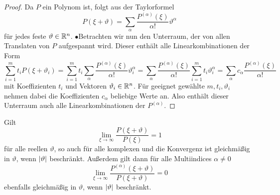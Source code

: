 \begin{proof}
\relax[$\supseteq$] Da $P$ ein Polynom ist, folgt aus der Taylorformel
\begin{equation}
P(\xi+\vartheta)=\sum_\alpha \dfrac{P^{(\alpha)}(\xi)}{\alpha!}\vartheta^{\alpha}
\end{equation}
für jedes feste $\vartheta\in\mathbb R^n$. $\bullet$\qquad [$\subseteq$] Betrachten wir nun den Unterraum, der von allen Translaten von $P$ aufgespannt wird. Dieser enthält alle Linearkombinationen der Form
\begin{equation}
\sum_{i=1}^m t_i P(\xi+\vartheta_i)=\sum_{i=1}^mt_i\sum_\alpha \dfrac{P^{(\alpha)}(\xi)}{\alpha!}\vartheta_i^\alpha =\sum_\alpha \dfrac{P^{(\alpha)}(\xi)}{\alpha!} \sum_{i=1}^mt_i\vartheta_i^\alpha=\sum_\alpha c_\alpha \dfrac{P^{(\alpha)}(\xi)}{\alpha!}
\end{equation}
mit Koeffizienten $t_i$ und Vektoren $\vartheta_i\in\mathbb R^n$. Für geeignet gewählte $ m,t_i,\vartheta_i $ nehmen dabei die Koeffizienten $c_\alpha$ beliebige Werte an. Also enthält dieser Unterraum auch alle Linearkombinationen der $P^{(\alpha)}$.
\end{proof}
\begin{lem}
Gilt
\begin{equation}
\lim_{\xi\to\infty}\dfrac{P(\xi+\vartheta)}{P(\xi)}=1
\end{equation}
für alle reellen $\vartheta$, so auch für alle komplexen und die Konvergenz ist gleichmäßig in $\vartheta$, wenn $\lvert\vartheta\rvert$ beschränkt. Außerdem gilt dann für alle Multiindices $\alpha\neq0$
\begin{equation}
\lim_{\xi\to\infty}\dfrac{P^{(\alpha)}(\xi+\vartheta)}{P(\xi+\vartheta)}=0
\end{equation}
ebenfalls gleichmäßig in $\vartheta$, wenn $\lvert\vartheta\rvert$ beschränkt.
\end{lem}

